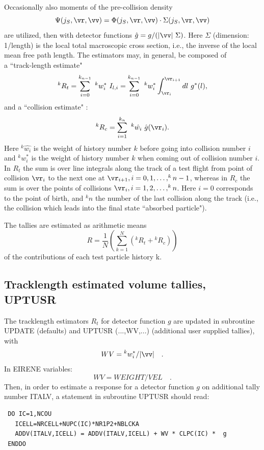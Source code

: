 Occasionally also
moments of the pre-collision density
\begin{displaymath}
\Psi ( j_S ,
\vr , \vv )   =
\Phi ( j_S , \vr , \vv )
    \cdot     \Sigma ( j_S , \vr , \vv )
\end{displaymath}
are utilized, then
with detector functions $ \hat{g}   =   g /
(| \vv | \ \Sigma)    $.
Here $\Sigma$ (dimension: 1/length) is the local total macroscopic
cross section, i.e., the inverse of the local mean free path length.
The estimators may, in general, be composed of
\\ a ``track-length estimate"
\begin{equation} \label{tracklest}
^k{R_t}  =
\sum_{i=0}^{k_{n-1}}   \ ^k w_i^* \  I_{l,i}
  =   \sum_{i=0}^{k_{n-1}} \ ^k w_i^*
\int_{\vr_i}^{\vr_{i+1}}   dl \  g^{*} (l)     ,
\end{equation}
and a ``collision estimate" :
\begin{equation} \label{collest}
^k{R_c}  =   \sum_{i=1}^{k_n}   \ ^k{\hat{w_i}} \
\hat{g} ( \vr_i )     .
\end{equation}
Here $  ^k{\hat{w_i}}$ is the weight of history number
$k$ before
going into collision number
$i$ and $ ^k{w_{i}^{*}}$ is the
weight of history number $k$ when coming out of collision number $i$.
In $R_t$ the sum is over line
integrals along the track of a test flight
from point of collision $ \vr_i$
to the next one at $\vr_{i+1} ,   i=0,1,
\dots , ^k{n-1} $, whereas in $R_c$ the sum is over
the points of collisions $\vr_i ,  i=1,2, \dots ,
^kn$. Here $i=0$ corresponds to the point of birth, and
$^kn$ the number of the last collision
along the track (i.e., the collision
which leads into the final state ``absorbed
particle").

The tallies are estimated as arithmetic means
\begin{equation}
R   =   \frac{1}{N}   \left ( \sum_{k=1}^{N}
(^k{R_t}  +  {^k{R_c}} ) \right )
\end{equation}
of the contributions of each test particle history k.

\subsection{Tracklength estimated volume tallies, UPTUSR}\label{sec3.2.1}

The tracklength estimators $R_t$ for detector function $g$ are
updated in subroutine UPDATE (defaults) and UPTUSR (...,WV,...)
(additional user supplied tallies), with
\begin{displaymath}
WV   =
{^k{w_{i}^{*}}}  /   | \vv | \quad .
\end{displaymath}
In EIRENE variables:
\begin{displaymath}
 WV = WEIGHT/VEL  \quad .
\end{displaymath}
Then, in order to estimate a response for a detector function $g$ on
additional tally number ITALV, a statement in subroutine UPTUSR
should read:
\begin{verbatim}
 DO IC=1,NCOU
   ICELL=NRCELL+NUPC(IC)*NR1P2+NBLCKA
   ADDV(ITALV,ICELL) = ADDV(ITALV,ICELL) + WV * CLPC(IC) *  g
 ENDDO
\end{verbatim}

